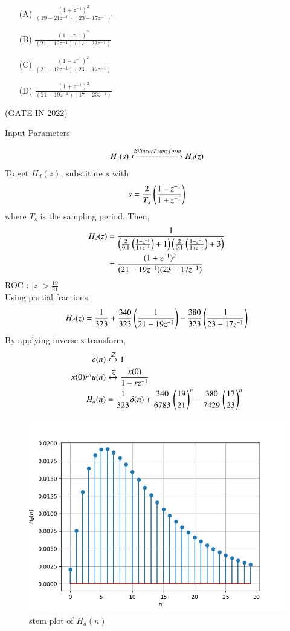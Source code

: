 \documentclass[journal,12pt,twocolumn]{IEEEtran}
\theoremstyle{remark}
\begin{document}
\begin{enumerate}
\item[(A)] $\frac{(1+z^{-1})^2}{(19-21z^{-1})(23-17z^{-1})}$\\
\item[(B)] $\frac{(1-z^{-1})^2}{(21-19z^{-1})(17-23z^{-1})}$\\
\item[(C)] $\frac{(1+z^{-1})^2}{(21-19z^{-1})(23-17z^{-1})}$\\
\item[(D)] $\frac{(1+z^{-1})^2}{(21-19z^{-1})(17-23z^{-1})}$
\end{enumerate}
\hfill{(GATE IN 2022)}\\
\solution
\begin{table}[h!]
\centering

\caption{Input Parameters}
\label{tab:gate2022in38table}
\end{table}
\begin{align}
H_c(s) \xleftrightarrow{Bilinear Transform} H_d(z)
\end{align}
To get $H_d(z)$, substitute $s$ with
\begin{align}
s = \frac{2}{T_s}\left(\frac{1-z^{-1}}{1+z^{-1}}\right)
\end{align}
where $T_s$ is the sampling period. Then,
\begin{align}
H_d(z) &= \frac{1}{\left(\frac{2}{0.1}\left(\frac{1-z^{-1}}{1+z^{-1}}\right)+1\right){\left(\frac{2}{0.1}\left(\frac{1-z^{-1}}{1+z^{-1}}\right)+3\right)}}\\
&= \frac{(1+z^{-1})^2}{(21-19z^{-1})(23-17z^{-1})}
\end{align}
ROC : $|z| > \frac{19}{21}$\\
Using partial fractions,
\begin{align}
H_d(z) = \frac{1}{323} + \frac{340}{323}\left(\frac{1}{21-19z^{-1}}\right) - \frac{380}{323}\left(\frac{1}{23-17z^{-1}}\right)
\end{align}
By applying inverse z-transform,
\begin{align}
\delta(n) &\xleftrightarrow{\mathcal{Z}} 1\\
x(0)r^{n}u(n) &\xleftrightarrow{\mathcal{Z}} \frac{x(0)}{1-rz^{-1}}\\
H_d(n) &= \frac{1}{323}\delta(n) + \frac{340}{6783}\left(\frac{19}{21}\right)^{n} - \frac{380}{7429}\left(\frac{17}{23}\right)^{n}
\end{align}
\begin{figure}[h!]
    \centering
    \includegraphics[width=0.8\columnwidth]{figs/plot.png}
    \caption{stem plot of $H_d(n)$}
    \label{fig:gate2022in38fig}
\end{figure}
\end{document}
